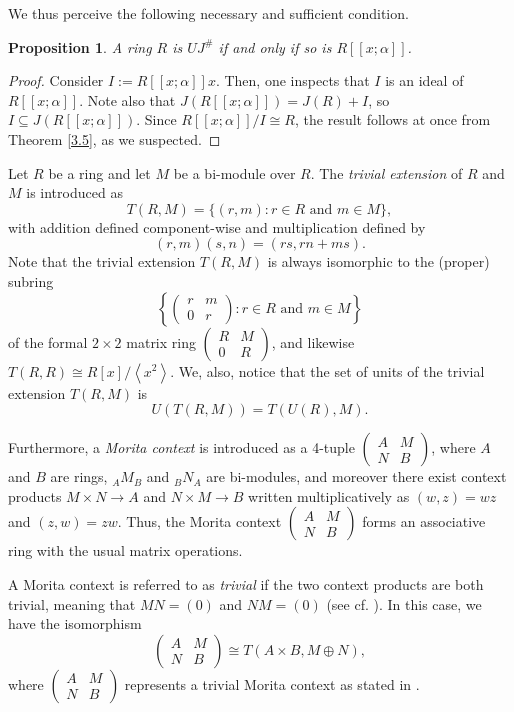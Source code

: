 \documentclass[12pt]{amsart}
\newtheorem{proposition}[theorem]{Proposition}
\theoremstyle{definition}
\begin{document}
We thus perceive the following necessary and sufficient condition.

\begin{proposition}\label{3.2}
A ring $R$ is $UJ^{\#}$ if and only if so is $R[[x; \alpha]]$.
\end{proposition}

\begin{proof}
Consider $I:= R[[x; \alpha]]x$. Then, one inspects that $I$ is an ideal of $R[[x; \alpha]]$. Note also that $J(R[[x; \alpha]])=J(R)+I$, so $I\subseteq J(R[[x; \alpha]])$. Since $R[[x; \alpha]]/I\cong R$, the result follows at once from Theorem \ref{3.5}, as we suspected.
\end{proof}

Let $R$ be a ring and let $M$ be a bi-module over $R$. The {\it trivial extension} of $R$ and $M$ is introduced as
\[ T(R, M) = \{(r, m) : r \in R \text{ and } m \in M\}, \]
with addition defined component-wise and multiplication defined by
\[ (r, m)(s, n) = (rs, rn + ms). \]
Note that the trivial extension $T(R, M)$ is always isomorphic to the (proper) subring
\[ \left\{ \begin{pmatrix} r & m \\ 0 & r \end{pmatrix} : r \in R \text{ and } m \in M \right\} \]
of the formal $2 \times 2$ matrix ring $\begin{pmatrix} R & M \\ 0 & R \end{pmatrix}$, and likewise $T(R, R) \cong R[x]/\left\langle x^2 \right\rangle$. We, also, notice that the set of units of the trivial extension $T(R, M)$ is
\[ U(T(R, M)) = T(U(R), M). \]

Furthermore, a {\it Morita context} is introduced as a 4-tuple $\begin{pmatrix} A & M \\ N & B \end{pmatrix}$, where $A$ and $B$ are rings, $_AM_B$ and $_BN_A$ are bi-modules, and moreover there exist context products $M\times N \to A$ and $N\times M \to B$ written multiplicatively as $(w, z) = wz$ and $(z, w) = zw$. Thus, the Morita context $\begin{pmatrix} A & M \\ N & B \end{pmatrix}$ forms an associative ring with the usual matrix operations.

A Morita context is referred to as {\it trivial} if the two context products are both trivial, meaning that $MN = (0)$ and $NM = (0)$ (see cf. \cite[p. 1993]{Mari}). In this case, we have the isomorphism
$$\begin{pmatrix} A & M \\ N & B \end{pmatrix} \cong T(A \times B, M\oplus N),$$
where $\begin{pmatrix} A & M \\ N & B \end{pmatrix}$ represents a trivial Morita context as stated in \cite{20}.
\end{document}
